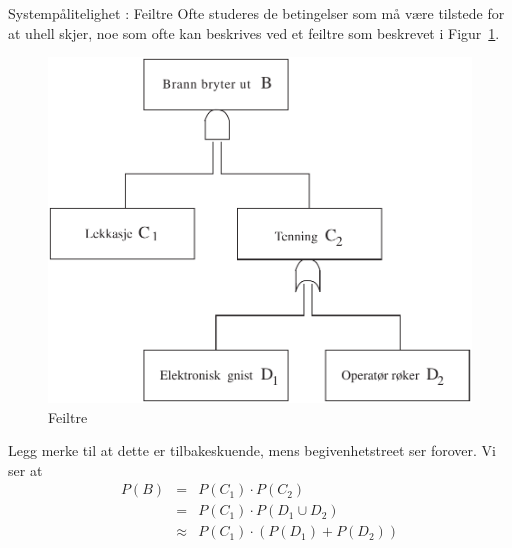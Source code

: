 \begin{eksempel}{Systempålitelighet : Feiltre}
Ofte studeres de betingelser som må være tilstede for at uhell skjer,
noe som ofte kan beskrives ved et feiltre som beskrevet i Figur~\ref{fig:feiltre}.

\begin{figure}[ht]
\centering\centering
\includegraphics[scale=0.6]{figurer/fig4_7.pdf} 
\caption{Feiltre}
	\label{fig:feiltre}
\end{figure}

Legg merke til at dette er tilbakeskuende, mens begivenhetstreet ser forover.
Vi ser at
\begin{eqnarray*}
P(B)&=&P(C_1) \cdot P(C_2) \\
    &=&P(C_1) \cdot P(D_1 \cup D_2) \\
    &\approx&P(C_1) \cdot (P(D_1)+P(D_2))
\end{eqnarray*}
\end{eksempel}
\normalsize

